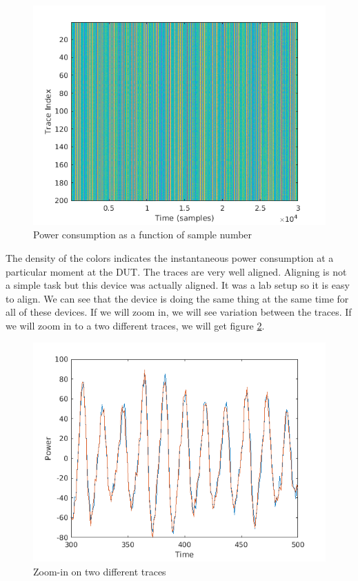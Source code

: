 \begin{figure}[H]
    \centering
    \includegraphics[width=1.0\textwidth]{images/chapter8/DataSet.png}
    \caption{Power consumption as a function of sample number} \label{c8_Matlab_power_as_sample_number:fig}
\end{figure}
The density of the colors indicates the instantaneous power consumption at a particular moment at the DUT. The traces are very well aligned. Aligning is not a simple task but this device was actually aligned. It was a lab setup so it is easy to align. We can see that the device is doing the same thing at the same time for all of these devices. If we will zoom in, we will see variation between the traces. If we will zoom in to a two different traces, we will get figure \ref{c8_Matlab_zoomin_on_two_traces:fig}.
\begin{figure}[H]
    \centering
    \includegraphics[width=1.0\textwidth]{images/chapter8/TwoSamples.png}
    \caption{Zoom-in on two different traces} \label{c8_Matlab_zoomin_on_two_traces:fig}
\end{figure}
